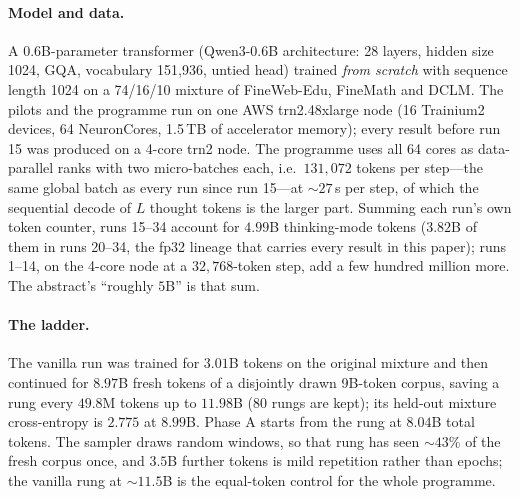 \documentclass{article} %
\begin{document}
\paragraph{Model and data.} A 0.6B-parameter transformer (Qwen3-0.6B architecture: 28 layers, hidden size 1024, GQA, vocabulary 151{,}936, untied head) trained \emph{from scratch} with sequence length 1024 on a 74/16/10 mixture of FineWeb-Edu, FineMath and DCLM. The pilots and the programme run on one AWS trn2.48xlarge node (16 Trainium2 devices, 64 NeuronCores, 1.5\,TB of accelerator memory); every result before run 15 was produced on a 4-core trn2 node. The programme uses all 64 cores as data-parallel ranks with two micro-batches each, i.e.\ $131{,}072$ tokens per step---the same global batch as every run since run 15---at ${\sim}27$\,s per step, of which the sequential decode of $L$ thought tokens is the larger part. Summing each run's own token counter, runs 15--34 account for $4.99$B thinking-mode tokens ($3.82$B of them in runs 20--34, the fp32 lineage that carries every result in this paper); runs 1--14, on the 4-core node at a $32{,}768$-token step, add a few hundred million more. The abstract's ``roughly $5$B'' is that sum.

\paragraph{The ladder.} The vanilla run was trained for $3.01$B tokens on the original mixture and then continued for $8.97$B fresh tokens of a disjointly drawn 9B-token corpus, saving a rung every $49.8$M tokens up to $11.98$B (80 rungs are kept); its held-out mixture cross-entropy is $2.775$ at $8.99$B. Phase A starts from the rung at $8.04$B total tokens. The sampler draws random windows, so that rung has seen ${\sim}43\%$ of the fresh corpus once, and $3.5$B further tokens is mild repetition rather than epochs; the vanilla rung at ${\sim}11.5$B is the equal-token control for the whole programme.
\end{document}
